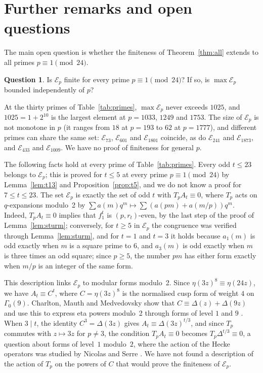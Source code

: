 \documentclass[12pt]{amsart}
\theoremstyle{definition}
\newtheorem{question}[theorem]{Question}
\newcommand{\cE}{\mathcal{E}}
\begin{document}
\section{Further remarks and open questions}\label{sec:remarks}

The main open question is whether the finiteness of Theorem~\ref{thm:all} extends to all primes $p\equiv1\pmod{24}$.

\begin{question}
Is $\cE_p$ finite for every prime $p\equiv1\pmod{24}$? If so, is $\max\cE_p$ bounded independently of $p$?
\end{question}

At the thirty primes of Table~\ref{tab:primes}, $\max\cE_p$ never exceeds $1025$, and $1025=1+2^{10}$ is the largest element at $p=1033$, $1249$ and $1753$. The size of $\cE_p$ is not monotone in $p$ (it ranges from $18$ at $p=193$ to $62$ at $p=1777$), and different primes can share the same set: $\cE_{73}$, $\cE_{601}$ and $\cE_{1801}$ coincide, as do $\cE_{241}$ and $\cE_{1873}$, and $\cE_{433}$ and $\cE_{1009}$. We have no proof of finiteness for general $p$.

The following facts hold at every prime of Table~\ref{tab:primes}. Every odd $t\le23$ belongs to $\cE_p$; this is proved for $t\le5$ at every prime $p\equiv1\pmod{24}$ by Lemma~\ref{lem:t13} and Proposition~\ref{prop:t5}, and we do not know a proof for $7\le t\le23$. The set $\cE_p$ is exactly the set of odd $t$ with $T_pA_t\equiv0$, where $T_p$ acts on $q$-expansions modulo~2 by $\sum a(m)q^m\mapsto\sum(a(pm)+a(m/p))q^m$. Indeed, $T_pA_t\equiv0$ implies that $f_1^t$ is $(p,r_t)$-even, by the last step of the proof of Lemma~\ref{lem:sturm}; conversely, for $t\ge5$ in $\cE_p$ the congruence was verified through Lemma~\ref{lem:sturm}, and for $t=1$ and $t=3$ it holds because $a_1(m)$ is odd exactly when $m$ is a square prime to $6$, and $a_3(m)$ is odd exactly when $m$ is three times an odd square; since $p\ge5$, the number $pm$ has either form exactly when $m/p$ is an integer of the same form.

This description links $\cE_p$ to modular forms modulo~2. Since $\eta(3z)^8\equiv\eta(24z)$, we have $A_t\equiv C^t$, where $C=\eta(3z)^8$ is the normalised cusp form of weight $4$ on $\Gamma_0(9)$. Charlton, Mauth and Medvedovsky show that $C\equiv\Delta(z)+\Delta(9z)$ and use this to express eta powers modulo~2 through forms of level $1$ and $9$ \cite[Lemma~2.3 and Proposition~2.4]{CMM}. When $3\mid t$, the identity $C^3=\Delta(3z)$ gives $A_t\equiv\Delta(3z)^{t/3}$, and since $T_p$ commutes with $z\mapsto3z$ for $p\ne3$, the condition $T_pA_t\equiv0$ becomes $T_p\Delta^{t/3}\equiv0$, a question about forms of level~$1$ modulo~$2$, where the action of the Hecke operators was studied by Nicolas and Serre \cite{NS1,NS2}. We have not found a description of the action of $T_p$ on the powers of $C$ that would prove the finiteness of $\cE_p$.
\end{document}

